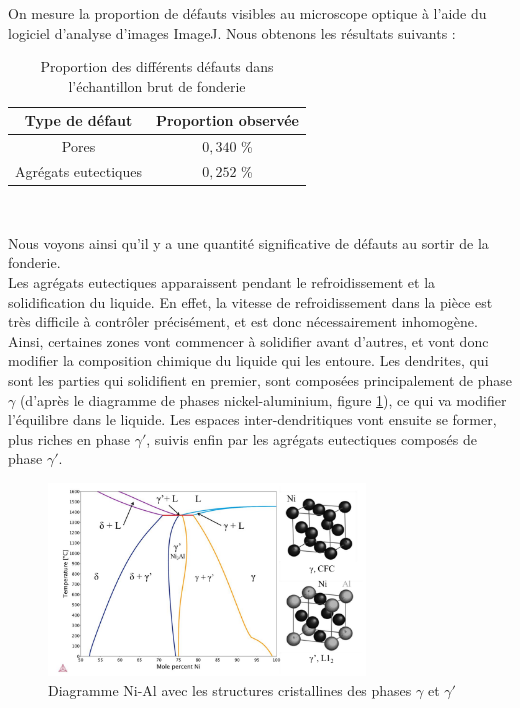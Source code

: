 On mesure la proportion de défauts visibles au microscope optique à l'aide du 
logiciel d'analyse d'images ImageJ. Nous obtenons les résultats suivants : \\


\begin{table}[H]
    \centering
    \caption{Proportion des différents défauts dans l'échantillon brut de fonderie}
    \begin{tabular}{|c|c|}
        \hline
        \textbf{Type de défaut}  & \textbf{Proportion observée}  \\
        \hline
        Pores                & $0,340$ \% \\
        Agrégats eutectiques & $0,252$ \% \\
        \hline
    \end{tabular}
    \\
    \label{tab:proportions_defauts_brut}
\end{table}


Nous voyons ainsi qu'il y a une quantité significative de défauts au sortir de la fonderie.\\


Les agrégats eutectiques apparaissent pendant le refroidissement 
et la solidification du liquide. En effet, la vitesse de refroidissement dans 
la pièce est très difficile à contrôler précisément, et est donc nécessairement
inhomogène. Ainsi, certaines zones vont commencer à solidifier avant d'autres, et 
vont donc modifier la composition chimique du liquide qui les entoure. 
Les dendrites, qui sont les parties qui solidifient en premier, sont composées 
principalement de phase $\gamma$ (d'après le diagramme de phases nickel-aluminium, 
figure \ref{fig:diagramme_phases_Ni_Al}), ce qui va modifier l'équilibre dans le liquide.
Les espaces inter-dendritiques vont ensuite se former,  plus riches en phase $\gamma'$, 
suivis enfin par les agrégats eutectiques composés de phase $\gamma'$.\\


\begin{figure}[H]
    \centering
    \includegraphics[width=0.75\textwidth]{images/diagramme_phase.png}
    \caption{Diagramme Ni-Al avec les structures cristallines des phases $\gamma$ et $\gamma'$}
    \label{fig:diagramme_phases_Ni_Al}
\end{figure}



